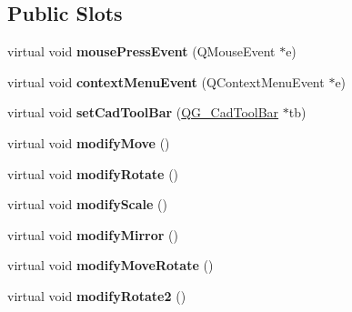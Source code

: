 \subsection*{Public Slots}
\begin{DoxyCompactItemize}
\item 
\hypertarget{classQG__CadToolBarModify_ac5018b2b740ab958e6b003b0de996d00}{virtual void {\bfseries mouse\-Press\-Event} (Q\-Mouse\-Event $\ast$e)}\label{classQG__CadToolBarModify_ac5018b2b740ab958e6b003b0de996d00}

\item 
\hypertarget{classQG__CadToolBarModify_ab41ac0a3b8081765a3d88b7daba3b321}{virtual void {\bfseries context\-Menu\-Event} (Q\-Context\-Menu\-Event $\ast$e)}\label{classQG__CadToolBarModify_ab41ac0a3b8081765a3d88b7daba3b321}

\item 
\hypertarget{classQG__CadToolBarModify_a118335604cf0006d9fe95142cac8c685}{virtual void {\bfseries set\-Cad\-Tool\-Bar} (\hyperlink{classQG__CadToolBar}{Q\-G\-\_\-\-Cad\-Tool\-Bar} $\ast$tb)}\label{classQG__CadToolBarModify_a118335604cf0006d9fe95142cac8c685}

\item 
\hypertarget{classQG__CadToolBarModify_aedd48568f5db17564230bccfb1b21127}{virtual void {\bfseries modify\-Move} ()}\label{classQG__CadToolBarModify_aedd48568f5db17564230bccfb1b21127}

\item 
\hypertarget{classQG__CadToolBarModify_a27427dde70e1f66110e9d66ac7895ee3}{virtual void {\bfseries modify\-Rotate} ()}\label{classQG__CadToolBarModify_a27427dde70e1f66110e9d66ac7895ee3}

\item 
\hypertarget{classQG__CadToolBarModify_ac0bc013176fae58663291a6a49a68efd}{virtual void {\bfseries modify\-Scale} ()}\label{classQG__CadToolBarModify_ac0bc013176fae58663291a6a49a68efd}

\item 
\hypertarget{classQG__CadToolBarModify_a15cf6ea1c1feac7c0c91f526e69570c5}{virtual void {\bfseries modify\-Mirror} ()}\label{classQG__CadToolBarModify_a15cf6ea1c1feac7c0c91f526e69570c5}

\item 
\hypertarget{classQG__CadToolBarModify_a858d8d661cbec85bf25ebb68182c8683}{virtual void {\bfseries modify\-Move\-Rotate} ()}\label{classQG__CadToolBarModify_a858d8d661cbec85bf25ebb68182c8683}

\item 
\hypertarget{classQG__CadToolBarModify_a7ff5ce9dbaa28793938e725e7880ca66}{virtual void {\bfseries modify\-Rotate2} ()}\label{classQG__CadToolBarModify_a7ff5ce9dbaa28793938e725e7880ca66}


\end{DoxyCompactItemize}

